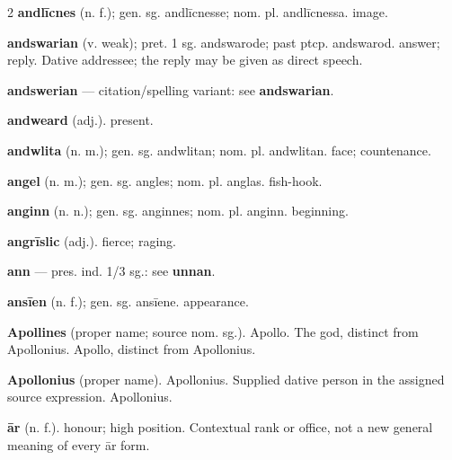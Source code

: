 \begin{multicols*}{2}
\textbf{andlīcnes} (n. f.); gen. sg. andlīcnesse; nom. pl. andlīcnessa. image.\par
\textbf{andswarian} (v. weak); pret. 1 sg. andswarode; past ptcp. andswarod. answer; reply. Dative addressee; the reply may be given as direct speech.\par
\textbf{andswerian} — citation/spelling variant: see \textbf{andswarian}.\par
\textbf{andweard} (adj.). present.\par
\textbf{andwlita} (n. m.); gen. sg. andwlitan; nom. pl. andwlitan. face; countenance.\par
\textbf{angel} (n. m.); gen. sg. angles; nom. pl. anglas. fish-hook.\par
\textbf{anginn} (n. n.); gen. sg. anginnes; nom. pl. anginn. beginning.\par
\textbf{angrīslic} (adj.). fierce; raging.\par
\textbf{ann} — pres. ind. 1/3 sg.: see \textbf{unnan}.\par
\textbf{ansīen} (n. f.); gen. sg. ansīene. appearance.\par
\textbf{Apollines} (proper name; source nom. sg.). Apollo. The god, distinct from Apollonius. Apollo, distinct from Apollonius.\par
\textbf{Apollonius} (proper name). Apollonius. Supplied dative person in the assigned source expression. Apollonius.\par
\textbf{ār} (n. f.). honour; high position. Contextual rank or office, not a new general meaning of every ār form.\par

\end{multicols*}
